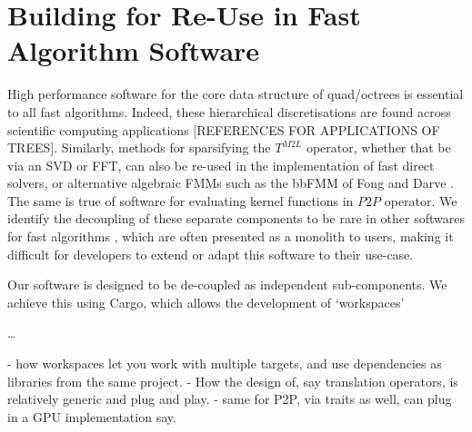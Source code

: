 \section{Building for Re-Use in Fast Algorithm Software}\label{chpt:2:sec:3}

High performance software for the core data structure of quad/octrees is essential to all fast algorithms. Indeed, these hierarchical discretisations are found across scientific computing applications [REFERENCES FOR APPLICATIONS OF TREES]. Similarly, methods for sparsifying the $T^{M2L}$ operator, whether that be via an SVD or FFT, can also be re-used in the implementation of fast direct solvers, or alternative algebraic FMMs such as the bbFMM of Fong and Darve \cite{fong2009black}. The same is true of software for evaluating kernel functions in $P2P$ operator. We identify the decoupling of these separate components to be rare in other softwares for fast algorithms \cite{malhotra2015pvfmm,wang2021exafmm,h2lib2016github}, which are often presented as a monolith to users, making it difficult for developers to extend or adapt this software to their use-case.

Our software is designed to be de-coupled as independent sub-components. We achieve this using Cargo, which allows the development of `workspaces'

\dots

- how workspaces let you work with multiple targets, and use dependencies as libraries from the same project.
- How the design of, say translation operators, is relatively generic and plug and play.
- same for P2P, via traits as well, can plug in a GPU implementation say.
